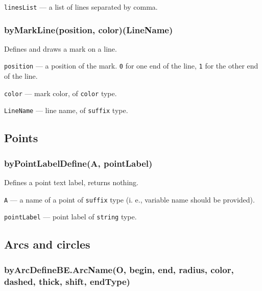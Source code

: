 \documentclass{ltxdoc}
\begin{document}
	\texttt{linesList} — a list of lines separated by comma.

\subsubsection{byMarkLine(position, color)(LineName)}

	Defines and draws a mark on a line.
	
	\texttt{position} — a position of the mark. \texttt{0} for one end of the line, \texttt{1} for the other end of the line.
	
	\texttt{color} — mark color, of \texttt{color} type.
	
	\texttt{LineName} — line name, of \texttt{suffix} type.


\subsection{Points}

\subsubsection{byPointLabelDefine(A, pointLabel)}

Defines a point text label, returns nothing.

\texttt{A} — a name of a point of \texttt{suffix} type  (i. e., variable name should be provided).

\texttt{pointLabel} — point label of \texttt{string} type.


\subsection{Arcs and circles}


\subsubsection{byArcDefineBE.ArcName(O, begin, end, radius, color, dashed, thick, shift, endType)}
\end{document}
